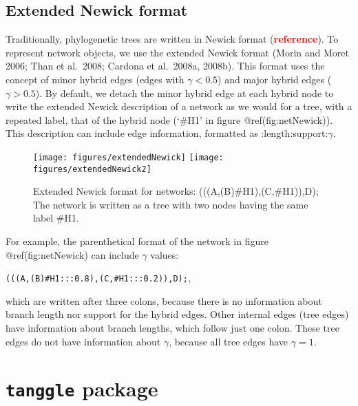 \documentclass[]{IEEEtran}
\begin{document}
\vspace{-0.25cm}

\hypertarget{extended-newick-format}{%
\subsection{Extended Newick format}\label{extended-newick-format}}

Traditionally, phylogenetic trees are written in Newick format
(\textcolor{red}{\textbf{reference}}). To represent network objects, we
use the extended Newick format (Morin and Moret 2006; Than et al.~2008;
Cardona et al.~2008a, 2008b). This format uses the concept of minor
hybrid edges (edges with \(\gamma < 0.5\)) and major hybrid edges
(\(\gamma > 0.5\)). By default, we detach the minor hybrid edge at each
hybrid node to write the extended Newick description of a network as we
would for a tree, with a repeated label, that of the hybrid node (`\#H1'
in figure @ref(fig:netNewick)). This description can include edge
information, formatted as :length:support:\(\gamma\).

\begin{figure}

{\centering \texttt{[image: figures/extendedNewick]} \texttt{[image: figures/extendedNewick2]} 

}

\caption{Extended Newick format for networks: (((A,(B)\#H1),(C,\#H1)),D); The network is written as a tree with two nodes having the same label \#H1.}\label{fig:netNewick}
\end{figure}

For example, the parenthetical format of the network in figure
@ref(fig:netNewick) can include \(\gamma\) values:

\texttt{(((A,(B)\#H1:::0.8),(C,\#H1:::0.2)),D);},

which are written after three colons, because there is no information
about branch length nor support for the hybrid edges. Other internal
edges (tree edges) have information about branch lengths, which follow
just one colon. These tree edges do not have information about
\(\gamma\), because all tree edges have \(\gamma=1\).

\hypertarget{tanggle-package}{%
\section{\texorpdfstring{\texttt{tanggle}
package}{tanggle package}}\label{tanggle-package}}
\end{document}
